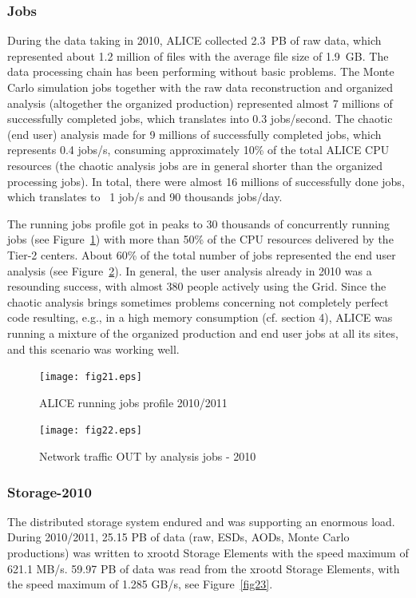 \subsubsection{Jobs}
%
During the data taking in 2010, ALICE collected 2.3~PB of raw data,
which represented about 1.2 million of files with the average file
size of 1.9~GB. The data processing chain has been performing
without basic problems.  The Monte Carlo simulation jobs together
with the raw data reconstruction and organized analysis (altogether
the organized production) represented almost 7 millions of
successfully completed jobs, which translates into 0.3 jobs/second.
The chaotic (end user) analysis made for 9 millions of successfully
completed jobs, which represents 0.4 jobs/s, consuming approximately
10\% of the total ALICE CPU resources (the chaotic analysis jobs are
in general shorter than the organized processing jobs).  In total,
there were almost 16 millions of successfully done jobs, which
translates to ~1 job/s and 90 thousands jobs/day.

The running jobs profile got in peaks to 30 thousands of
concurrently running jobs (see Figure~\ref{fig21}) with more than
50\% of the CPU resources delivered by the Tier-2 centers. About
60\% of the total number of jobs represented the end user analysis
(see Figure~\ref{fig22}). In general, the user analysis already in
2010 was a resounding success, with almost 380 people actively using
the Grid. Since the chaotic analysis brings sometimes problems
concerning not completely perfect code resulting, e.g., in a high
memory consumption (cf. section 4), ALICE was running a mixture of
the organized production and end user jobs at all its sites, and
this scenario was working well.

\begin{figure}[htb] %
\centering
\texttt{[image: fig21.eps]} %
\caption{ALICE running jobs profile 2010/2011}\label{fig21}
\end{figure}


\begin{figure}[htb] %
\centering
\texttt{[image: fig22.eps]} %
\caption{Network traffic OUT by analysis jobs - 2010}\label{fig22}
\end{figure}



\subsubsection{Storage-2010}
%
The distributed storage system endured and was supporting an
enormous load. During 2010/2011, 25.15 PB of data (raw, ESDs, AODs,
Monte Carlo  productions) was written to xrootd Storage Elements
with the speed maximum of 621.1 MB/s. 59.97 PB  of data was read
from the xrootd Storage Elements, with the speed maximum of 1.285
GB/s, see Figure~\ref{fig23}.

